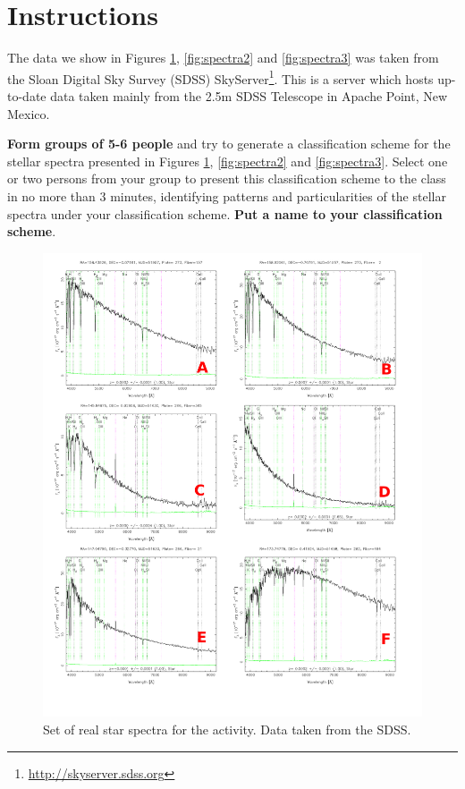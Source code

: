 \documentclass{tufte-handout}
\begin{document}
\section{Instructions}\label{sec:intro}
\begin{fullwidth}
The data we show in Figures \ref{fig:spectra}, \ref{fig:spectra2} and \ref{fig:spectra3} was taken from the Sloan Digital Sky Survey (SDSS) 
SkyServer\footnote{\url{http://skyserver.sdss.org}}. This is a server which hosts up-to-date data taken mainly from the 
2.5m SDSS Telescope in Apache Point, New Mexico. 

\textbf{Form groups of 5-6 people} and try to generate a classification scheme for the stellar spectra presented in Figures \ref{fig:spectra}, 
\ref{fig:spectra2} and \ref{fig:spectra3}. Select one or two persons from your group to present this classification scheme to the class in no 
more than 3 minutes, identifying patterns and particularities of the stellar spectra under your classification scheme. 
\textbf{Put a name to your classification scheme}.

\begin{figure}
  \includegraphics[width=2.0\columnwidth]{figures_activity4/spectra1.pdf}
  \caption{Set of real star spectra for the activity. Data taken from the SDSS.}
  \label{fig:spectra}
\end{figure}


\end{fullwidth}
\end{document}
